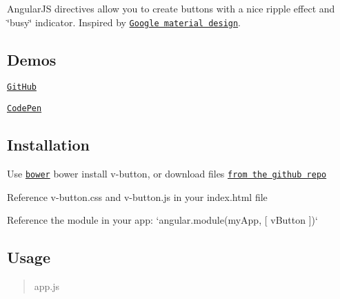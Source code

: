 Angular\+JS directives allow you to create buttons with a nice ripple effect and \char`\"{}busy\char`\"{} indicator. Inspired by \href{http://www.google.com/design/spec/material-design/introduction.html}{\tt Google material design}.

\subsection*{Demos}


\begin{DoxyItemize}
\item \href{http://lukaszwatroba.github.io/v-button}{\tt Git\+Hub}
\item \href{http://codepen.io/LukaszWatroba/pen/YPNvpX}{\tt Code\+Pen}
\end{DoxyItemize}

\subsection*{Installation}


\begin{DoxyItemize}
\item Use \href{http://bower.io/}{\tt bower} {\ttfamily bower install v-\/button}, or download files \href{./dist}{\tt from the github repo}
\item Reference {\ttfamily v-\/button.\+css} and {\ttfamily v-\/button.\+js} in your index.\+html file
\item Reference the module in your app\+: `angular.module(\textquotesingle{}my\+App\textquotesingle{}, \mbox{[} \textquotesingle{}v\+Button\textquotesingle{} \mbox{]})`
\end{DoxyItemize}

\subsection*{Usage}

\begin{quote}
app.\+js \end{quote}





